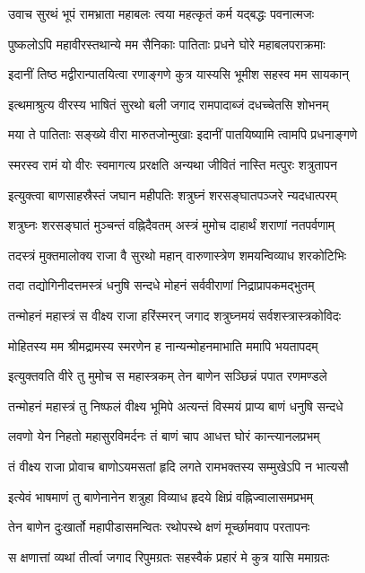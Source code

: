 \twolineshloka
{उवाच सुरथं भूपं रामभ्राता महाबलः}
{त्वया महत्कृतं कर्म यद्बद्धः पवनात्मजः}%

\twolineshloka
{पुष्कलोऽपि महावीरस्तथान्ये मम सैनिकाः}
{पातिताः प्रधने घोरे महाबलपराक्रमाः}%

\twolineshloka
{इदानीं तिष्ठ मद्वीरान्पातयित्वा रणाङ्गणे}
{कुत्र यास्यसि भूमीश सहस्व मम सायकान्}%

\twolineshloka
{इत्थमाश्रुत्य वीरस्य भाषितं सुरथो बली}
{जगाद रामपादाब्जं दधच्चेतसि शोभनम्}%

\twolineshloka
{मया ते पातिताः सङ्ख्ये वीरा मारुतजोन्मुखाः}
{इदानीं पातयिष्यामि त्वामपि प्रधनाङ्गणे}%

\twolineshloka
{स्मरस्व रामं यो वीरः स्वमागत्य प्ररक्षति}
{अन्यथा जीवितं नास्ति मत्पुरः शत्रुतापन}%

\twolineshloka
{इत्युक्त्वा बाणसाहस्रैस्तं जघान महीपतिः}
{शत्रुघ्नं शरसङ्घातपञ्जरे न्यदधात्परम्}%

\twolineshloka
{शत्रुघ्नः शरसङ्घातं मुञ्चन्तं वह्निदैवतम्}
{अस्त्रं मुमोच दाहार्थं शराणां नतपर्वणाम्}%

\twolineshloka
{तदस्त्रं मुक्तमालोक्य राजा वै सुरथो महान्}
{वारुणास्त्रेण शमयन्विव्याध शरकोटिभिः}%

\twolineshloka
{तदा तद्योगिनीदत्तमस्त्रं धनुषि सन्दधे}
{मोहनं सर्ववीराणां निद्राप्रापकमद्भुतम्}%

\twolineshloka
{तन्मोहनं महास्त्रं स वीक्ष्य राजा हरिंस्मरन्}
{जगाद शत्रुघ्नमयं सर्वशस्त्रास्त्रकोविदः}%

\twolineshloka
{मोहितस्य मम श्रीमद्रामस्य स्मरणेन ह}
{नान्यन्मोहनमाभाति ममापि भयतापदम्}%

\twolineshloka
{इत्युक्तवति वीरे तु मुमोच स महास्त्रकम्}
{तेन बाणेन सञ्छिन्नं पपात रणमण्डले}%

\twolineshloka
{तन्मोहनं महास्त्रं तु निष्फलं वीक्ष्य भूमिपे}
{अत्यन्तं विस्मयं प्राप्य बाणं धनुषि सन्दधे}%

\twolineshloka
{लवणो येन निहतो महासुरविमर्दनः}
{तं बाणं चाप आधत्त घोरं कान्त्यानलप्रभम्}%

\twolineshloka
{तं वीक्ष्य राजा प्रोवाच बाणोऽयमसतां हृदि}
{लगते रामभक्तस्य सम्मुखेऽपि न भात्यसौ}%

\twolineshloka
{इत्येवं भाषमाणं तु बाणेनानेन शत्रुहा}
{विव्याध हृदये क्षिप्रं वह्निज्वालासमप्रभम्}%

\twolineshloka
{तेन बाणेन दुःखार्तो महापीडासमन्वितः}
{रथोपस्थे क्षणं मूर्च्छामवाप परतापनः}%

\twolineshloka
{स क्षणात्तां व्यथां तीर्त्वा जगाद रिपुमग्रतः}
{सहस्वैकं प्रहारं मे कुत्र यासि ममाग्रतः}%

